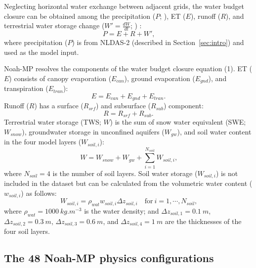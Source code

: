 \documentclass[essd, manuscript]{copernicus}
\let\unit\undefined
\begin{document}
Neglecting horizontal water exchange between adjacent grids, the water budget closure can be obtained among the precipitation (\(P\); \unit{kg.m^{-2}.s^{-1}}), ET (\(E\)), runoff (\(R\)), and terrestrial water storage change (\(W'=\frac{dW}{dt}\); \unit{kg.m^{-2}.s^{-1}}) \citep{zheng2020JAMES}:
\begin{equation}
  P = E + R + W'
  \text{,}
\end{equation}
where precipitation (\(P\)) is from NLDAS-2 (described in Section~\ref{sec:intro}) and used as the model input.

Noah-MP resolves the components of the water budget closure equation (1). ET (\(E\)) consists of canopy evaporation (\(E_{can}\)), ground evaporation (\(E_{gnd}\)), and transpiration (\(E_{tran}\)):
\begin{equation}
  E = E_{can} + E_{gnd} + E_{tran}
  \text{.}
\end{equation}
Runoff (\(R\)) has a surface (\(R_{srf}\)) and subsurface (\(R_{sub}\)) component:
\begin{equation}
  R = R_{srf} + R_{sub}
  \text{.}
\end{equation}
Terrestrial water storage (TWS; \(W\)) is the sum of snow water equivalent (SWE; \(W_{snow}\)), groundwater storage in unconfined aquifers (\(W_{gw}\)), and soil water content in the four model layers (\(W_{soil,i}\)):
\begin{equation}
  W = W_{snow} + W_{gw} + \sum_{i=1}^{N_{soil}} W_{soil,i}
  \text{,}
\end{equation}
where \(N_{soil} = 4\) is the number of soil layers. Soil water storage (\(W_{soil,i}\)) is not included in the dataset but can be calculated from the volumetric water content (\(w_{soil,i}\)) as follows:
\begin{equation}
  W_{soil,i} = \rho_{wat} w_{soil,i} \Delta z_{soil,i} \quad \mathrm{for}\ i = 1, \cdots, N_{soil}
  \text{,}
\end{equation}
where \(\rho_{wat} = \qty{1000}{kg.m^{-3}}\) is the water density; and \(\Delta z_{soil,1} = \qty{0.1}{m}\), \(\Delta z_{soil,2} = \qty{0.3}{m}\), \(\Delta z_{soil,3} = \qty{0.6}{m}\), and \(\Delta z_{soil,4} = \qty{1}{m}\) are the thicknesses of the four soil layers.

\subsection{The 48 Noah-MP physics configurations}\label{sec:data:noahmp}
\end{document}
